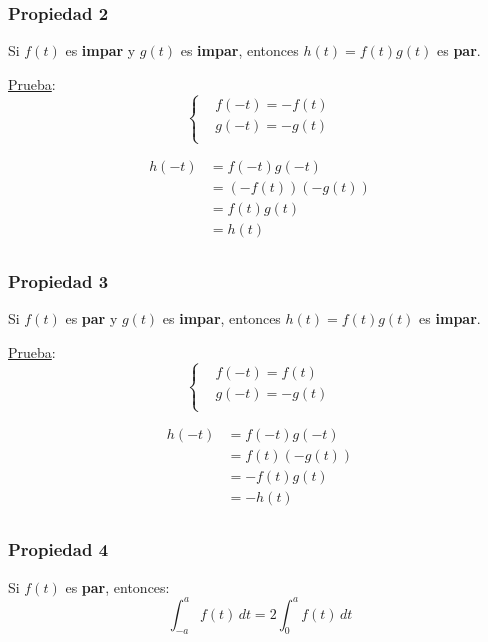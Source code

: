 \subsubsection*{Propiedad 2}
Si $f(t)$ es \textbf{impar} y $g(t)$ es \textbf{impar}, entonces $h(t)=f(t)g(t)$
es \textbf{par}.

\underline{Prueba}:
\begin{equation*}
\begin{cases}
    &f(-t)=-f(t)\\
    &g(-t)=-g(t)\\
\end{cases}
\end{equation*}

\begin{equation*}
\begin{split}
    h(-t)
        &=f(-t)g(-t)\\
        &=(-f(t))(-g(t))\\
        &=f(t)g(t)\\
        &=h(t)\\
\end{split}
\end{equation*}

\subsubsection*{Propiedad 3}
Si $f(t)$ es \textbf{par} y $g(t)$ es \textbf{impar}, entonces $h(t)=f(t)g(t)$
es \textbf{impar}.

\underline{Prueba}:
\begin{equation*}
\begin{cases}
    &f(-t)=f(t)\\
    &g(-t)=-g(t)\\
\end{cases}
\end{equation*}

\begin{equation*}
\begin{split}
    h(-t)
        &=f(-t)g(-t)\\
        &=f(t)(-g(t))\\
        &=-f(t)g(t)\\
        &=-h(t)\\
\end{split}
\end{equation*}

\subsubsection*{Propiedad 4}
Si $f(t)$ es \textbf{par}, entonces:
\begin{equation}
    \int_{-a}^a f(t)\,dt=2\int_0^a f(t)\,dt
\end{equation}

